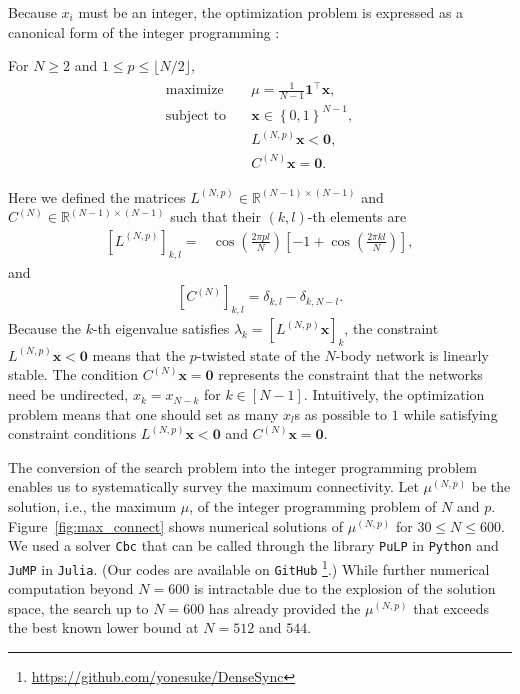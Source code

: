 Because $x_{i}$ must be an integer, the optimization problem is expressed as a canonical form of the integer programming \cite{Conforti2014}:
\begin{problem}
    \label{prob:integer-programming}
    For $N\geq2$ and $1\leq p\leq\lfloor N/2\rfloor$,
    \begin{align}
    \begin{split}
    \textrm{maximize} & \quad\mu=\frac{1}{N-1}\bm{1}^{\top}\bm{x}, \\
    \textrm{subject to} & \quad \bm{x}\in\left\{0,1\right\}^{N-1},\\
    & \quad L^{(N,p)}\bm{x}<\bm{0},\\
    & \quad C^{(N)}\bm{x} = \bm{0}.
    \end{split}
    \label{eq:problem}
    \end{align}
\end{problem}
Here we defined the matrices $L^{(N,p)}\in\mathbb{R}^{(N-1)\times(N-1)}$ and $C^{(N)}\in\mathbb{R}^{(N-1)\times(N-1)}$ such that their $(k,l)$-th elements are
\begin{align}
    \left[L^{(N,p)}\right]_{k,l} = &\cos\left(\frac{2\pi pl}{N}\right)\left[-1+\cos\left(\frac{2\pi kl}{N}\right)\right],
\end{align}
and
\begin{align}
    \left[C^{(N)}\right]_{k,l} = \delta_{k,l}-\delta_{k,N-l}.
\end{align}
Because the $k$-th eigenvalue satisfies $\lambda_{k} = \left[L^{(N,p)}\bm{x}\right]_{k}$, the constraint $L^{(N,p)}\bm{x}<\bm{0}$ means that the $p$-twisted state of the $N$-body network is linearly stable. The condition $C^{(N)}\bm{x}=\bm{0}$ represents the constraint that the networks need be undirected, $x_{k} = x_{N-k}$ for $k\in[N-1]$. Intuitively, the optimization problem means that one should set as many $x_l$s as possible to $1$ while satisfying constraint conditions $L^{(N,p)}\bm{x}<\bm{0}$ and $C^{(N)}\bm{x} = \bm{0}$.

The conversion of the search problem into the integer programming problem enables us to systematically survey the maximum connectivity. Let $\mu^{(N,p)}$ be the solution, i.e., the maximum $\mu$, of the integer programming problem of $N$ and $p$. Figure~\ref{fig:max_connect} shows numerical solutions of $\mu^{(N,p)}$ for $30\leq N\leq 600$. We used a solver \texttt{Cbc}\cite{cbc} that can be called through the library \texttt{PuLP} in \texttt{Python} and \texttt{JuMP}\cite{DunningHuchetteLubin2017} in \texttt{Julia}\cite{Julia-2017}. (Our codes are available on \texttt{GitHub} \footnote{\url{https://github.com/yonesuke/DenseSync}}.) While further numerical computation beyond $N=600$ is intractable due to the explosion of the solution space, the search up to $N=600$ has already provided the $\mu^{(N,p)}$ that exceeds the best known lower bound at $N=512$ and $544$.

